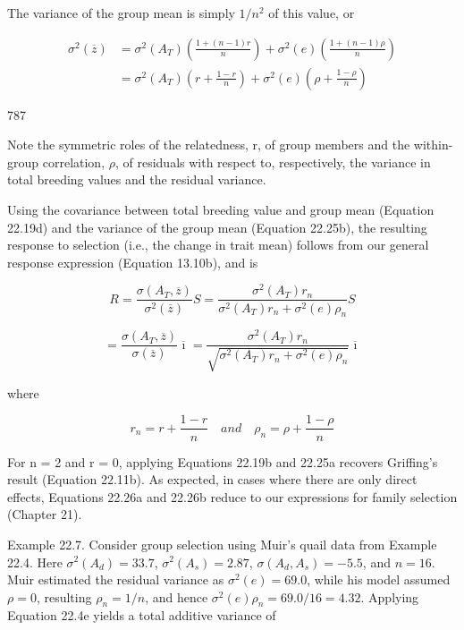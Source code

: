 \documentclass{article}
\begin{document}
The variance of the group mean is simply  $ 1/n^{2} $ of this value, or

\begin{equation}
\begin{aligned}\sigma^{2}(\overline{z})&=\sigma^{2}(A_{T})\left(\frac{1+(n-1)r}{n}\right)+\sigma^{2}(e)\left(\frac{1+(n-1)\rho}{n}\right)\\&=\sigma^{2}(A_{T})\left(r+\frac{1-r}{n}\right)+\sigma^{2}(e)\left(\rho+\frac{1-\rho}{n}\right)\end{aligned}
\tag{22.25b}
\label{eq:22_25b}
\end{equation}

787

Note the symmetric roles of the relatedness, r, of group members and the within-group correlation,  $ \rho $, of residuals with respect to, respectively, the variance in total breeding values and the residual variance.

Using the covariance between total breeding value and group mean (Equation 22.19d) and the variance of the group mean (Equation 22.25b), the resulting response to selection (i.e., the change in trait mean) follows from our general response expression (Equation 13.10b), and is

\begin{equation}
R=\frac{\sigma(A_{T},\overline{z})}{\sigma^{2}(\overline{z})}S=\frac{\sigma^{2}(A_{T})r_{n}}{\sigma^{2}(A_{T})r_{n}+\sigma^{2}(e)\rho_{n}}S
\tag{22.26a}
\label{eq:22_26a}
\end{equation}

\begin{equation}
=\frac{\sigma(A_{T},\overline{z})}{\sigma(\overline{z})}\overline{\imath}=\frac{\sigma^{2}(A_{T})r_{n}}{\sqrt{\sigma^{2}(A_{T})r_{n}+\sigma^{2}(e)\rho_{n}}}\overline{\imath}
\tag{22.26b}
\label{eq:22_26b}
\end{equation}

where

\begin{equation}
r_{n}=r+\frac{1-r}{n}\quad and\quad\rho_{n}=\rho+\frac{1-\rho}{n}
\end{equation}

For n = 2 and r = 0, applying Equations 22.19b and 22.25a recovers Griffing's result (Equation 22.11b). As expected, in cases where there are only direct effects, Equations 22.26a and 22.26b reduce to our expressions for family selection (Chapter 21).

Example 22.7. Consider group selection using Muir's quail data from Example 22.4. Here  $ \sigma^2(A_d) = 33.7 $,  $ \sigma^2(A_s) = 2.87 $,  $ \sigma(A_d, A_s) = -5.5 $, and  $ n = 16 $. Muir estimated the residual variance as  $ \sigma^2(e) = 69.0 $, while his model assumed  $ \rho = 0 $, resulting  $ \rho_n = 1/n $, and hence  $ \sigma^2(e)\rho_n = 69.0/16 = 4.32 $. Applying Equation 22.4e yields a total additive variance of
\end{document}
